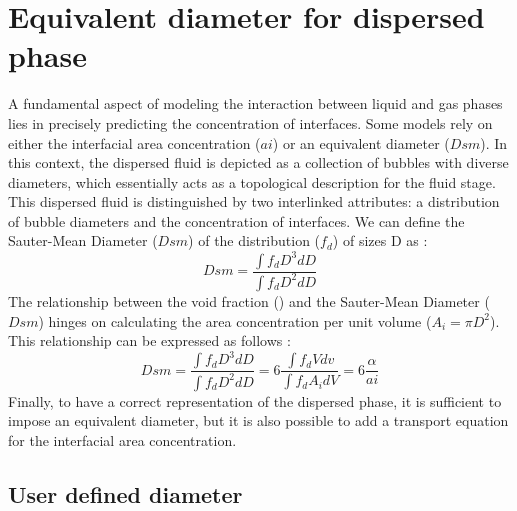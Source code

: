 \section{Equivalent diameter for dispersed phase\label{sec:diam-mgmt}}
\label{sec:IATE}
A fundamental aspect of modeling the interaction between liquid and gas phases lies in precisely predicting the concentration of interfaces. Some models rely on either the interfacial area concentration ($ai$) or an equivalent diameter ($Dsm$). In this context, the dispersed fluid is depicted as a collection of bubbles with diverse diameters, which essentially acts as a topological description for the fluid stage. This dispersed fluid is distinguished by two interlinked attributes: a distribution of bubble diameters and the concentration of interfaces. We can define the Sauter-Mean Diameter ($Dsm$) of the distribution ($f_d$) of sizes D as :
\begin{equation}
Dsm=\frac{\int f_dD^3 dD}{\int f_d D^2 dD}
\end{equation}
The relationship between the void fraction (\alpha) and the Sauter-Mean Diameter ($Dsm$)  hinges on calculating the area concentration per unit volume ($A_i=\pi D^2$). This relationship can be expressed as follows :
\begin{equation}
Dsm=\frac{\int f_dD^3 dD}{\int f_d D^2 dD}=6\frac{\int f_d V dv}{\int f_d A_i dV}=6\frac{\alpha}{ai}
\end{equation}
Finally, to have a correct representation of the dispersed phase, it is sufficient to impose an equivalent diameter, but it is also possible to add a transport equation for the interfacial area concentration.

\subsection{User defined diameter}\label{Dsmuserdefine}

%

